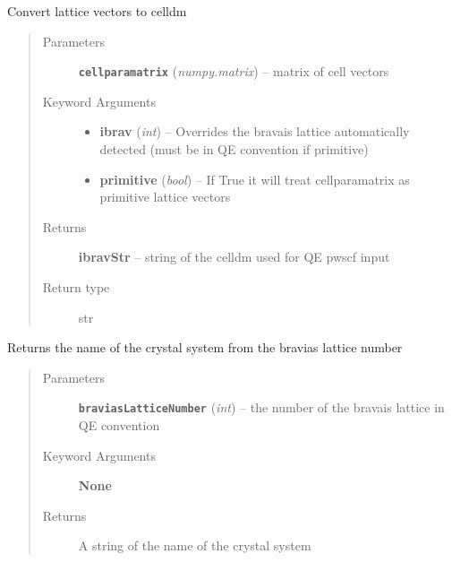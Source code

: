 \documentclass[letterpaper,10pt,english]{sphinxmanual}
\begin{document}
\begin{fulllineitems}
\label{retr:retr.free2ibrav}
Convert lattice vectors to celldm
\begin{quote}\begin{description}
\item[{Parameters}] \leavevmode
\textbf{\texttt{cellparamatrix}} (\emph{numpy.matrix}) -- matrix of cell vectors

\item[{Keyword Arguments}] \leavevmode\begin{itemize}
\item {} 
\textbf{ibrav} (\emph{int}) --
Overrides the bravais lattice automatically detected
(must be in QE convention if primitive)

\item {} 
\textbf{primitive} (\emph{bool}) --
If True it will treat cellparamatrix as primitive lattice vectors

\end{itemize}

\item[{Returns}] \leavevmode
\textbf{ibravStr} --
string of the celldm used for QE pwscf input

\item[{Return type}] \leavevmode
str

\end{description}\end{quote}

\end{fulllineitems}


\begin{fulllineitems}
\label{retr:retr.getBravaisLatticeName}
Returns the name of the crystal system from the bravias lattice number
\begin{quote}\begin{description}
\item[{Parameters}] \leavevmode
\textbf{\texttt{braviasLatticeNumber}} (\emph{int}) -- the number of the bravais lattice in QE convention

\item[{Keyword Arguments}] \leavevmode
\textbf{None}

\item[{Returns}] \leavevmode
A string of the name of the crystal system

\end{description}\end{quote}

\end{fulllineitems}
\end{document}

